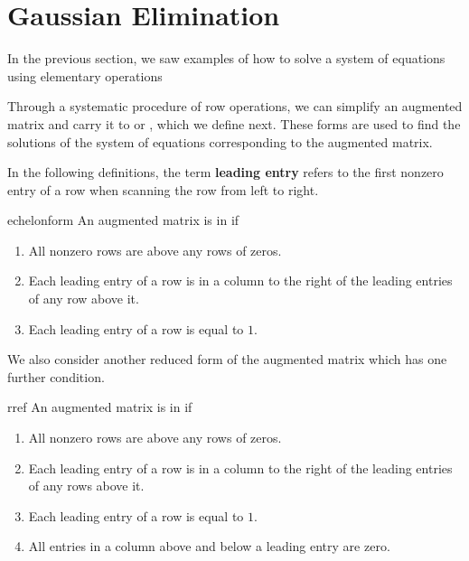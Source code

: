 \section{Gaussian Elimination}

In the previous section, we saw examples of how to solve a system of
equations using elementary operations


Through a systematic
procedure of row operations, we can simplify an augmented matrix and carry it to \textbf{\ef} or \textbf{\rref}, which we define next. These 
forms are used to find the solutions of the system of equations corresponding to the augmented matrix.

In the following definitions, the term
\textbf{leading entry}
refers to
 the first nonzero entry of a row when scanning the row
from left to right.

\begin{definition}{\EF}{echelonform}
An augmented matrix is
\index{\ef} in \textbf{\ef} if

\begin{enumerate}
\item All nonzero rows are above any rows of zeros.

\item Each leading entry of a row is in a column to the right of the leading entries of any row above it. 


\item Each leading entry of a row is equal to $1$.

\end{enumerate}
\end{definition}

We also consider another reduced form of the augmented matrix which has one further condition. 


\begin{definition}{\RREF}{rref}
An augmented 
\index{\rref} matrix is in \textbf{\rref } if

\begin{enumerate}
\item All nonzero rows are above any rows of zeros.

\item Each leading entry of a row is in a column to the right of the leading
entries of any rows above it.

\item Each leading entry of a row is equal to $1$.

\item All entries in a column above and below a leading entry are zero.

\end{enumerate}
\end{definition}

